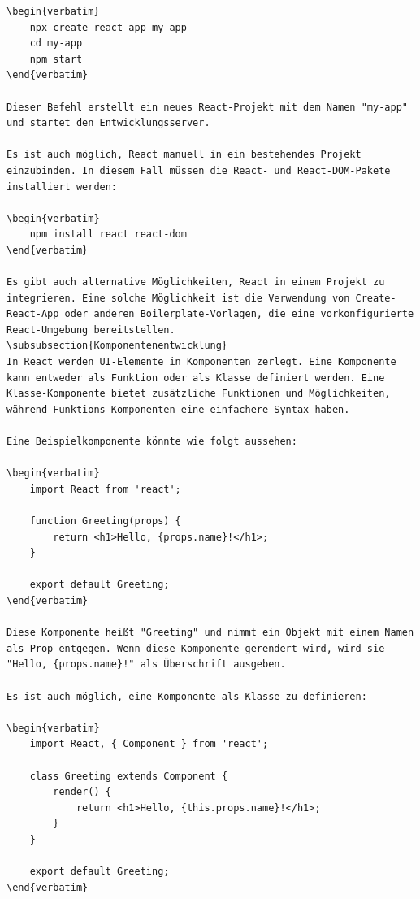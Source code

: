 \begin{lstlisting}
\begin{verbatim}
	npx create-react-app my-app
	cd my-app
	npm start
\end{verbatim}

Dieser Befehl erstellt ein neues React-Projekt mit dem Namen "my-app" und startet den Entwicklungsserver.

Es ist auch möglich, React manuell in ein bestehendes Projekt einzubinden. In diesem Fall müssen die React- und React-DOM-Pakete installiert werden:

\begin{verbatim}
	npm install react react-dom
\end{verbatim}

Es gibt auch alternative Möglichkeiten, React in einem Projekt zu integrieren. Eine solche Möglichkeit ist die Verwendung von Create-React-App oder anderen Boilerplate-Vorlagen, die eine vorkonfigurierte React-Umgebung bereitstellen.
\subsubsection{Komponentenentwicklung}
In React werden UI-Elemente in Komponenten zerlegt. Eine Komponente kann entweder als Funktion oder als Klasse definiert werden. Eine Klasse-Komponente bietet zusätzliche Funktionen und Möglichkeiten, während Funktions-Komponenten eine einfachere Syntax haben.

Eine Beispielkomponente könnte wie folgt aussehen:

\begin{verbatim}
	import React from 'react';
	
	function Greeting(props) {
		return <h1>Hello, {props.name}!</h1>;
	}
	
	export default Greeting;
\end{verbatim}

Diese Komponente heißt "Greeting" und nimmt ein Objekt mit einem Namen als Prop entgegen. Wenn diese Komponente gerendert wird, wird sie "Hello, {props.name}!" als Überschrift ausgeben.

Es ist auch möglich, eine Komponente als Klasse zu definieren:

\begin{verbatim}
	import React, { Component } from 'react';
	
	class Greeting extends Component {
		render() {
			return <h1>Hello, {this.props.name}!</h1>;
		}
	}
	
	export default Greeting;
\end{verbatim}


\end{lstlisting}
